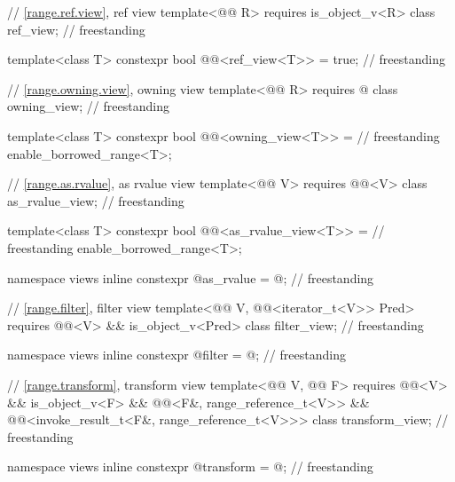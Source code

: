 \begin{codeblock}
{  // \ref{range.ref.view}, ref view
  template<@@ R>
    requires is_object_v<R>
  class ref_view;                                                                   // freestanding

  template<class T>
    constexpr bool @@<ref_view<T>> = true;                       // freestanding

  // \ref{range.owning.view}, owning view
  template<@@ R>
    requires @\seebelow@
  class owning_view;                                                                // freestanding

  template<class T>
    constexpr bool @@<owning_view<T>> =                          // freestanding
      enable_borrowed_range<T>;

  // \ref{range.as.rvalue}, as rvalue view
  template<@@ V>
    requires @@<V>
  class as_rvalue_view;                                                             // freestanding

  template<class T>
    constexpr bool @@<as_rvalue_view<T>> =                       // freestanding
      enable_borrowed_range<T>;

  namespace views { inline constexpr @\unspecnc@ as_rvalue = @\unspecnc@; }         // freestanding

  // \ref{range.filter}, filter view
  template<@@ V, @@<iterator_t<V>> Pred>
    requires @@<V> && is_object_v<Pred>
  class filter_view;                                                                // freestanding

  namespace views { inline constexpr @\unspecnc@ filter = @\unspecnc@; }            // freestanding

  // \ref{range.transform}, transform view
  template<@@ V, @@ F>
    requires @@<V> && is_object_v<F> &&
             @@<F&, range_reference_t<V>> &&
             @@<invoke_result_t<F&, range_reference_t<V>>>
  class transform_view;                                                             // freestanding

  namespace views { inline constexpr @\unspecnc@ transform = @\unspecnc@; }         // freestanding

}
\end{codeblock}
